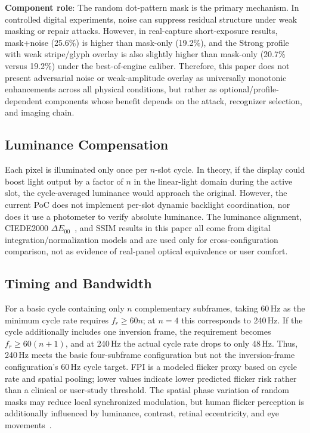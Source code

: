 \documentclass{ieeeaccess}
\begin{document}
\textbf{Component role}: The random dot-pattern mask is the primary mechanism. In controlled digital experiments, noise can suppress residual structure under weak masking or repair attacks. However, in real-capture short-exposure results, mask+noise (25.6\%) is higher than mask-only (19.2\%), and the Strong profile with weak stripe/glyph overlay is also slightly higher than mask-only (20.7\% versus 19.2\%) under the best-of-engine caliber. Therefore, this paper does not present adversarial noise or weak-amplitude overlay as universally monotonic enhancements across all physical conditions, but rather as optional/profile-dependent components whose benefit depends on the attack, recognizer selection, and imaging chain.

\subsection{Luminance Compensation}

Each pixel is illuminated only once per $n$-slot cycle. In theory, if the display could boost light output by a factor of $n$ in the linear-light domain during the active slot, the cycle-averaged luminance would approach the original. However, the current PoC does not implement per-slot dynamic backlight coordination, nor does it use a photometer to verify absolute luminance. The luminance alignment, CIEDE2000 $\Delta E_{00}$~\cite{b_ciede2000}, and SSIM results in this paper all come from digital integration/normalization models and are used only for cross-configuration comparison, not as evidence of real-panel optical equivalence or user comfort.

\subsection{Timing and Bandwidth}

For a basic cycle containing only $n$ complementary subframes, taking 60\,Hz as the minimum cycle rate requires $f_r\geq60n$; at $n=4$ this corresponds to 240\,Hz. If the cycle additionally includes one inversion frame, the requirement becomes $f_r\geq60(n+1)$, and at 240\,Hz the actual cycle rate drops to only 48\,Hz. Thus, 240\,Hz meets the basic four-subframe configuration but not the inversion-frame configuration's 60\,Hz cycle target. FPI is a modeled flicker proxy based on cycle rate and spatial pooling; lower values indicate lower predicted flicker risk rather than a clinical or user-study threshold. The spatial phase variation of random masks may reduce local synchronized modulation, but human flicker perception is additionally influenced by luminance, contrast, retinal eccentricity, and eye movements~\cite{b_cai2024,b_davis2015}.
\end{document}
